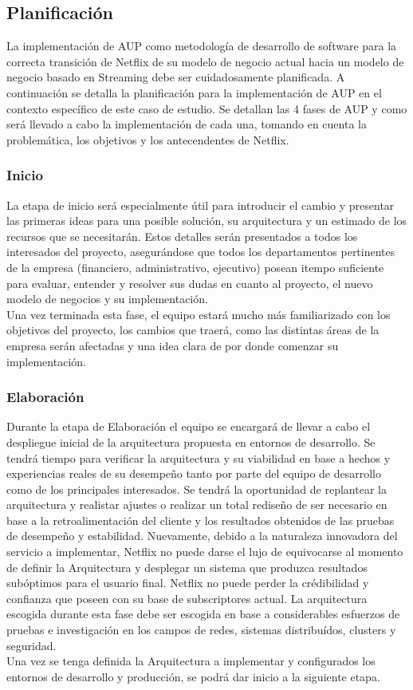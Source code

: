 \documentclass{article}
\begin{document}
\subsection{Planificación}
La implementación de AUP como metodología de desarrollo de
software para la correcta transición de Netflix de su modelo
de negocio actual hacia un modelo de negocio basado en Streaming
debe ser cuidadosamente planificada. A continuación se detalla la
planificación para la implementación de AUP en el contexto específico
de este caso de estudio. Se detallan las 4 fases de AUP y como 
será llevado a cabo la implementación de cada una, tomando en cuenta
la problemática, los objetivos y los antecendentes de Netflix.
\subsubsection{Inicio}
La etapa de inicio será especialmente útil para introducir el 
cambio y presentar las primeras ideas para una posible solución, su 
arquitectura y un estimado de los recursos que se necesitarán.
Estos detalles serán presentados a todos los interesados del proyecto,
asegurándose que todos los departamentos pertinentes de la empresa
(financiero, administrativo, ejecutivo) posean itempo suficiente
para evaluar, entender y resolver sus dudas en cuanto al proyecto,
el nuevo modelo de negocios y su implementación. \\
Una vez terminada esta fase, el equipo estará mucho más familiarizado
con los objetivos del proyecto, los cambios que traerá, como las
distintas áreas de la empresa serán afectadas y una idea clara
de por donde comenzar su implementación.
\subsubsection{Elaboración}
Durante la etapa de Elaboración el equipo se encargará de 
llevar a cabo el despliegue inicial de la arquitectura propuesta en 
entornos de desarrollo. Se tendrá tiempo para verificar la 
arquitectura y su viabilidad en base a hechos y experiencias reales
de su desempeño tanto por parte del equipo de desarrollo como 
de los principales interesados. Se tendrá la oportunidad de replantear
la arquitectura y realistar ajustes o realizar un total rediseño
de ser necesario en base a la retroalimentación del cliente y los
resultados obtenidos de las pruebas de desempeño y estabilidad.
Nuevamente, debido a la naturaleza innovadora del servicio a
implementar, Netflix no puede darse el lujo de equivocarse al momento
de definir la Arquitectura y desplegar un sistema que produzca
resultados subóptimos para el usuario final. Netflix no puede perder
la crédibilidad y confianza que poseen con su base de subscriptores
actual. La arquitectura escogida durante esta fase debe ser escogida
en base a considerables esfuerzos de pruebas e investigación en los
campos de redes, sistemas distribuídos, clusters y seguridad.
\\
Una vez se tenga definida la Arquitectura a implementar y configurados
los entornos de desarrollo y producción, se podrá dar inicio a la 
siguiente etapa.
\end{document}
